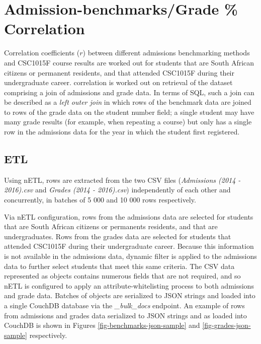 \section{Admission-benchmarks/Grade \% Correlation}
Correlation coefficients ($r$) between different admissions benchmarking methods and CSC1015F course results are worked out for students that are South African citizens or permanent residents, and that attended CSC1015F during their undergraduate career. correlation is worked out on retrieval of the dataset comprising a join of admissions and grade data. In terms of SQL, such a join can be described as a \textit{left outer join} in which rows of the benchmark data are joined to rows of the grade data on the student number field; a single student may have many grade results (for example, when repeating a course) but only has a single row in the admissions data for the year in which the student first registered.

\subsection{ETL}
Using nETL, rows are extracted from the two CSV files (\textit{Admissions (2014 - 2016).csv} and \textit{Grades (2014 - 2016).csv}) independently of each other and concurrently, in batches of 5 000 and 10 000 rows respectively.

Via nETL configuration, rows from the admissions data are selected for students that are South African citizens or permanents residents, and that are undergraduates. Rows from the grades data are selected for students that attended CSC1015F during their undergraduate career. Because this information is not available in the admissions data, dynamic filter is applied to the admissions data to further select students that meet this same criteria. The CSV data represented as objects contains numerous fields that are not required, and so nETL is configured to apply an attribute-whitelisting process to both admissions and grade data. Batches of objects are serialized to JSON strings and loaded into a single CouchDB database via the \textit{\_bulk\_docs} endpoint. An example of rows from admissions and grades data serialized to JSON strings and as loaded into CouchDB is shown in Figures \ref{fig-benchmarks-json-sample} and \ref{fig-grades-json-sample} respectively.






